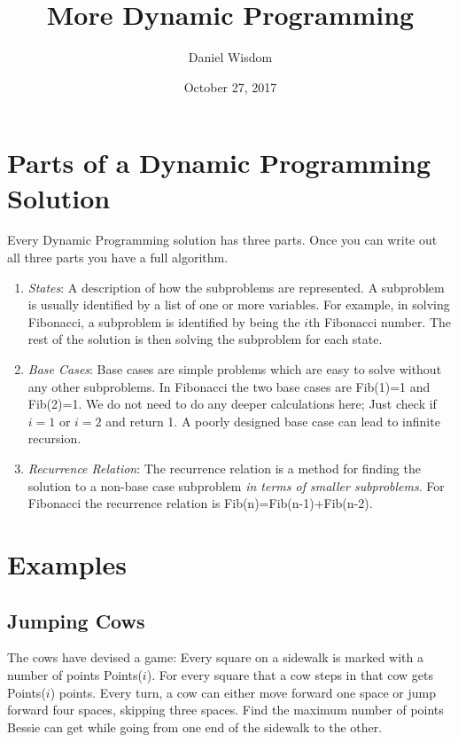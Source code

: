 \documentclass[11pt]{article}
\title{More Dynamic Programming}
\author{Daniel Wisdom}
\date{October 27, 2017}
\begin{document}
\maketitle



\section{Parts of a Dynamic Programming Solution}
Every Dynamic Programming solution has three parts.  Once you can write out all three parts you have a full algorithm.
\begin{enumerate}
    \item \textit{States}: A description of how the subproblems are represented.  A subproblem is usually identified by a list of one or more variables.  For example, in solving Fibonacci, a subproblem is identified by being the $i$th Fibonacci number.  The rest of the solution is then solving the subproblem for each state.   
\item \textit{Base Cases}: Base cases are simple problems which are easy to solve without any other subproblems.  In Fibonacci the two base cases are Fib(1)=1 and Fib(2)=1.  We do not need to do any deeper calculations here; Just check if $i=1$ or $i=2$ and return 1.  A poorly designed base case can lead to infinite recursion.
\item \textit{Recurrence Relation}: The recurrence relation is a method for finding the solution to a non-base case subproblem \textit{in terms of smaller subproblems}.  For Fibonacci the recurrence relation is Fib(n)=Fib(n-1)+Fib(n-2).
\end{enumerate}


\section{Examples}


\subsection{Jumping Cows}
The cows have devised a game: Every square on a sidewalk is marked with a number of points Points($i$). For every square that a cow steps in that cow gets Points($i$) points. Every turn, a cow can either move forward one space or jump forward four spaces, skipping three spaces.  Find the maximum number of points Bessie can get while going from one end of the sidewalk to the other.
\end{document}
